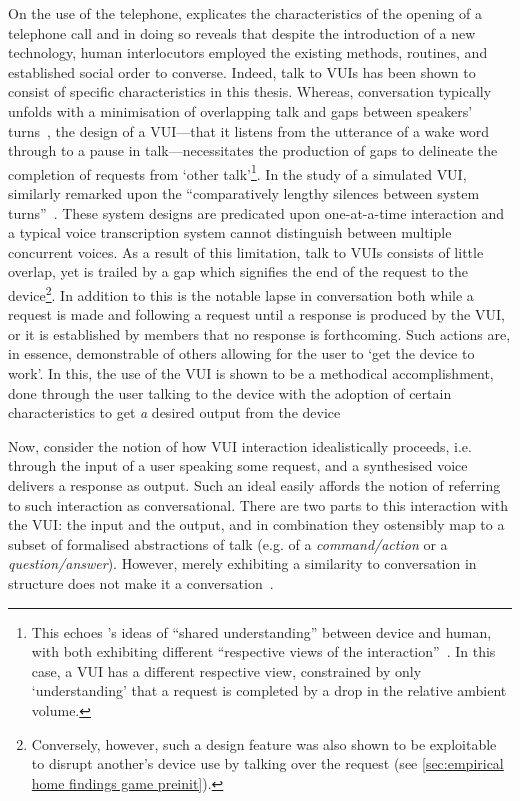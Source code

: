 \begin{corrections}
On the use of the telephone, \citet{Sacks1992b} explicates the characteristics of the opening of a telephone call and in doing so reveals that despite the introduction of a new technology, human interlocutors employed the existing methods, routines, and established social order to converse.
Indeed, talk to \acp{VUI} has been shown to consist of specific characteristics in this thesis.
Whereas, conversation typically unfolds with a minimisation of overlapping talk and gaps between speakers' turns~\citep[pp. 704--706]{Sacks1974}, the design of a \ac{VUI}---that it listens from the utterance of a wake word through to a pause in talk---necessitates the production of gaps to delineate the completion of requests from `other talk'\footnote{This echoes \citet{Suchman2006}'s ideas of ``shared understanding'' between device and human, with both exhibiting different ``respective views of the interaction''~\citep[pp. 123--124]{Suchman2006}. In this case, a \ac{VUI} has a different respective view, constrained by only `understanding' that a request is completed by a drop in the relative ambient volume.}.
In the study of a simulated \ac{VUI}, \citet{Wooffitt1994} similarly remarked upon the ``comparatively lengthy silences between system turns''~\citep[p. 104]{Wooffitt1994}.
These system designs are predicated upon one-at-a-time interaction and a typical voice transcription system cannot distinguish between multiple concurrent voices.
As a result of this limitation, talk to \acp{VUI} consists of little overlap, yet is trailed by a gap which signifies the end of the request to the device\footnote{Conversely, however, such a design feature was also shown to be exploitable to disrupt another's device use by talking over the request (see \ref{sec:empirical home findings game preinit}).}.
In addition to this is the notable lapse in conversation both while a request is made and following a request until a response is produced by the \ac{VUI}, or it is established by members that no response is forthcoming.
Such actions are, in essence, demonstrable of others allowing for the user to `get the device to work'.
In this, the use of the \ac{VUI} is shown to be a methodical accomplishment, done through the user talking to the device with the adoption of certain characteristics to get \textit{a} desired output from the device

Now, consider the notion of how \ac{VUI} interaction idealistically proceeds, i.e. through the input of a user speaking some request, and a synthesised voice delivers a response as output.
Such an ideal easily affords the notion of referring to such interaction as conversational.
There are two parts to this interaction with the \ac{VUI}: the input and the output, and in combination they ostensibly map to a subset of formalised abstractions of talk (e.g. of a \textit{command/action} or a \textit{question/answer}).
However, merely exhibiting a similarity to conversation in structure does not make it a conversation~\citep{Button1995}.


\end{corrections}
